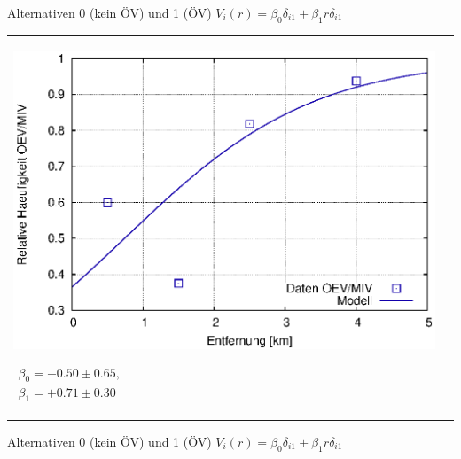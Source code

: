 \begin{landscape}
\begin{center}
{\small Alternativen 0 (kein \"OV) und 1 (\"OV) \quad
$V_i(r)=\beta_0 \delta_{i1} + \beta_1 r \delta_{i1}$}

\begin{tabular}{ll}
\parbox{1.00\textwidth}{
\includegraphics[width=1.0\textwidth]{figsRegr/revealedChoiceWS1516cum_2al_4dataPoints_fProb_r.eps}
}
\parbox{0.30\textwidth}{
 {\small
 $
 \begin{array}{l}
 \beta_0=-0.50\pm 0.65,\\
 \beta_1=+0.71\pm 0.30
 \end{array}
 $
}}
\end{tabular}

\newpage

\vspace{0em}  


{\small Alternativen 0 (kein \"OV) und 1 (\"OV) \quad
$V_i(r)=\beta_0 \delta_{i1} + \beta_1 r \delta_{i1}$}



\end{center}
\end{landscape}
